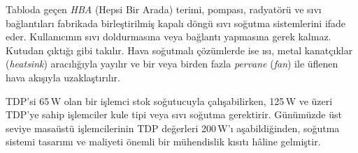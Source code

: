 Tabloda geçen \emph{HBA} (Hepsi Bir Arada) terimi, pompası, radyatörü ve sıvı bağlantıları fabrikada birleştirilmiş kapalı döngü sıvı soğutma sistemlerini ifade eder. Kullanıcının sıvı doldurmasına veya bağlantı yapmasına gerek kalmaz. Kutudan çıktığı gibi takılır. Hava soğutmalı çözümlerde ise ısı, metal kanatçıklar (\emph{heatsink}) aracılığıyla yayılır ve bir veya birden fazla \emph{pervane} (\emph{fan}) ile üflenen hava akışıyla uzaklaştırılır.

TDP'si 65\,W olan bir işlemci stok soğutucuyla çalışabilirken, 125\,W ve üzeri TDP'ye sahip işlemciler kule tipi veya sıvı soğutma gerektirir. Günümüzde üst seviye masaüstü işlemcilerinin TDP değerleri 200\,W'ı aşabildiğinden, soğutma sistemi tasarımı ve maliyeti önemli bir mühendislik kısıtı hâline gelmiştir.

